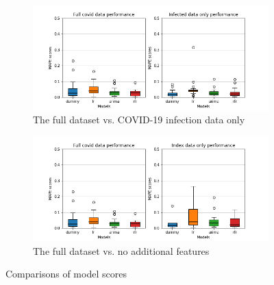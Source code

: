\begin{figure}
\begin{subfigure}[b]{.4\linewidth}
    \includegraphics[width=\linewidth]{thesis/images/plots/daily_full_covid_data_vs_infected_data_only_max_05.png}
    \caption{The full dataset vs. COVID-19 infection data only}
    \label{fig:infectvfull}
\end{subfigure} 
\begin{subfigure}[b]{.4\linewidth}
    \includegraphics[width=\linewidth]{thesis/images/plots/daily_full_covid_data_vs_index_data_only_max_05.png}
    \caption{The full dataset vs. no additional features}
    \label{fig:indexvfull}
\end{subfigure}
\caption{Comparisons of model scores}
\end{figure}

